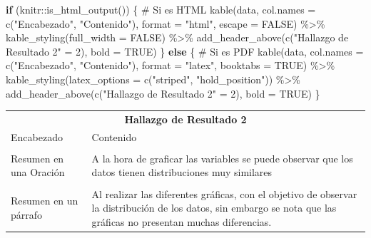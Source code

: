 \documentclass[
  letterpaper,
  DIV=11,
  numbers=noendperiod]{scrreprt}
\newenvironment{Shaded}{\begin{snugshade}}{\end{snugshade}}
\newcommand{\AttributeTok}[1]{\textcolor[rgb]{0.40,0.45,0.13}{#1}}
\newcommand{\CommentTok}[1]{\textcolor[rgb]{0.37,0.37,0.37}{#1}}
\newcommand{\ConstantTok}[1]{\textcolor[rgb]{0.56,0.35,0.01}{#1}}
\newcommand{\ControlFlowTok}[1]{\textcolor[rgb]{0.00,0.23,0.31}{\textbf{#1}}}
\newcommand{\DecValTok}[1]{\textcolor[rgb]{0.68,0.00,0.00}{#1}}
\newcommand{\FunctionTok}[1]{\textcolor[rgb]{0.28,0.35,0.67}{#1}}
\newcommand{\NormalTok}[1]{\textcolor[rgb]{0.00,0.23,0.31}{#1}}
\newcommand{\OtherTok}[1]{\textcolor[rgb]{0.00,0.23,0.31}{#1}}
\newcommand{\SpecialCharTok}[1]{\textcolor[rgb]{0.37,0.37,0.37}{#1}}
\newcommand{\StringTok}[1]{\textcolor[rgb]{0.13,0.47,0.30}{#1}}
\begin{document}
\begin{Shaded}
\begin{Highlighting}[]
\ControlFlowTok{if}\NormalTok{ (knitr}\SpecialCharTok{::}\FunctionTok{is\_html\_output}\NormalTok{()) \{}
  \CommentTok{\# Si es HTML}
  \FunctionTok{kable}\NormalTok{(data, }\AttributeTok{col.names =} \FunctionTok{c}\NormalTok{(}\StringTok{"Encabezado"}\NormalTok{, }\StringTok{"Contenido"}\NormalTok{), }
        \AttributeTok{format =} \StringTok{"html"}\NormalTok{, }
        \AttributeTok{escape =} \ConstantTok{FALSE}\NormalTok{) }\SpecialCharTok{\%\textgreater{}\%}
    \FunctionTok{kable\_styling}\NormalTok{(}\AttributeTok{full\_width =} \ConstantTok{FALSE}\NormalTok{) }\SpecialCharTok{\%\textgreater{}\%}
    \FunctionTok{add\_header\_above}\NormalTok{(}\FunctionTok{c}\NormalTok{(}\StringTok{"Hallazgo de Resultado 2"} \OtherTok{=} \DecValTok{2}\NormalTok{), }\AttributeTok{bold =} \ConstantTok{TRUE}\NormalTok{)}
\NormalTok{\} }\ControlFlowTok{else}\NormalTok{ \{}
  \CommentTok{\# Si es PDF}
  \FunctionTok{kable}\NormalTok{(data, }\AttributeTok{col.names =} \FunctionTok{c}\NormalTok{(}\StringTok{"Encabezado"}\NormalTok{, }\StringTok{"Contenido"}\NormalTok{), }
        \AttributeTok{format =} \StringTok{"latex"}\NormalTok{, }
        \AttributeTok{booktabs =} \ConstantTok{TRUE}\NormalTok{) }\SpecialCharTok{\%\textgreater{}\%}
    \FunctionTok{kable\_styling}\NormalTok{(}\AttributeTok{latex\_options =} \FunctionTok{c}\NormalTok{(}\StringTok{"striped"}\NormalTok{, }\StringTok{"hold\_position"}\NormalTok{)) }\SpecialCharTok{\%\textgreater{}\%}
    \FunctionTok{add\_header\_above}\NormalTok{(}\FunctionTok{c}\NormalTok{(}\StringTok{"Hallazgo de Resultado 2"} \OtherTok{=} \DecValTok{2}\NormalTok{), }\AttributeTok{bold =} \ConstantTok{TRUE}\NormalTok{)}
\NormalTok{\}}
\end{Highlighting}
\end{Shaded}

\begin{table}[!h]
\centering
\begin{tabular}{ll}
\toprule
\multicolumn{2}{c}{\textbf{Hallazgo de Resultado 2}} \\
\cmidrule(l{3pt}r{3pt}){1-2}
Encabezado & Contenido\\
\midrule
\cellcolor{gray!10}{Nombre de Su hallazgo} & \cellcolor{gray!10}{Datos muy Iguales}\\
Resumen en una Oración & A la hora de graficar las variables se puede observar que los datos tienen distribuciones muy similares\\
\cellcolor{gray!10}{Problemas o Posibles Desafíos} & \cellcolor{gray!10}{Este problema se puede estar ocasionando debido a que las variables de la base de datos se parecen mucho.}\\
Resumen en un párrafo & Al realizar las diferentes gráficas, con el objetivo de observar la distribución de los datos, sin embargo se nota que las gráficas no presentan muchas diferencias.\\
\bottomrule
\end{tabular}
\end{table}
\end{document}
